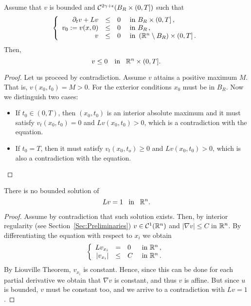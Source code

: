 \begin{theorem}
\label{Th:ParabolicmaxPrpBdd}
Assume that $v$ is bounded and $\mathcal{C}^{2\gamma+\epsilon}(B_R\times(0,T])$ such that
\begin{equation*}
\left\{\begin{array}{rcll}
\partial_t v + L v &\leq& 0 & \textrm{ in }B_R\times(0,T]\,,\\
v_0:=v(x,0) &\leq& 0 & \textrm{ in } B_R\,,\\
v &\leq& 0 & \textrm{ in } \left( \mathbb{R}^n\setminus B_R\right) \times (0,T] \,.
\end{array} \right.
\end{equation*}
Then, $$ v\leq 0 \,\,\,\, \text{ in } \,\,\, \mathbb{R}^n\times (0,T].  $$
\end{theorem}

\begin{proof}
Let us proceed by contradiction. Assume $v$ attains a positive maximum $M$. That is, $v(x_0,t_0) = M>0$. For the exterior conditions $x_0$ must be in $B_R$. Now we distinguish two cases:
\begin{itemize}
\item If $t_0\in(0,T)$, then $(x_0,t_0)$ is an interior absolute maximum and it must satisfy $v_t(x_0,t_0)=0$ and $Lv(x_0,t_0)>0$, which is a contradiction with the equation.\\
\item If $t_0 = T$, then it must satisfy $v_t(x_0,t_o)\geq 0$ and $Lv(x_0,t_0)>0$, which is also a contradiction with the equation.
\end{itemize}
\end{proof}

\begin{lemma}
\label{Lemma:NoBddSolL=1}
There is no bounded solution of $$Lv=1 \,\,\, \text{ in } \,\,\, \mathbb{R}^n.$$
\end{lemma}

\begin{proof}
Assume by contradiction that such solution exists. Then, by interior regularity (see Section~\ref{Sec:Preliminaries}) $v\in\mathcal{C}^{1}(\mathbb{R}^n)$ and $|\nabla v|\leq C$ in $\mathbb{R}^n$. By differentiating the equation with respect to $x_i$ we obtain
\begin{equation*}
\left\{\begin{array}{rcll}
L v_{x_i} &=& 0 & \textrm{ in } \mathbb{R}^n\,,\\
|v_{x_i}| &\leq& C & \textrm{ in } \mathbb{R}^n\,.
\end{array} \right.
\end{equation*}
By Liouville Theorem, $v_{x_i}$ is constant.  Hence, since this can be done for each partial derivative we obtain that $\nabla v$ is constant, and thus $v$ is affine. But since $u$ is bounded, $v$ must be constant too, and we arrive to a contradiction with $Lv=1$.
\end{proof}

